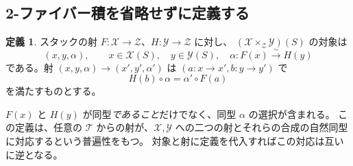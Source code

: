 \documentclass[dvipdfmx,a4paper,11pt]{article}
\theoremstyle{definition}
\newtheorem{dfn}[thm]{定義}
\begin{document}
\subsection{2-ファイバー積を省略せずに定義する}
\begin{dfn}\label{def:2fiber}
スタックの射 $F:\mathcal X\to\mathcal Z$、$H:\mathcal Y\to\mathcal Z$ に対し、
$(\mathcal X\times_{\mathcal Z}\mathcal Y)(S)$ の対象は
\[
(x,y,\alpha),\qquad x\in\mathcal X(S),\quad y\in\mathcal Y(S),\quad
\alpha:F(x)\xrightarrow{\sim}H(y)
\]
である。射 $(x,y,\alpha)\to(x',y',\alpha')$ は $(a:x\to x',b:y\to y')$ で
\[
H(b)\circ\alpha=\alpha'\circ F(a)
\]
を満たすものとする。
\end{dfn}
$F(x)$ と $H(y)$ が同型\emph{であること}だけでなく、同型 $\alpha$ の選択が含まれる。
この定義は、任意の $\mathcal T$ からの射が、$\mathcal X,\mathcal Y$ への二つの射とそれらの合成の自然同型に対応するという普遍性をもつ。
対象と射に定義を代入すればこの対応は互いに逆となる。
\end{document}
